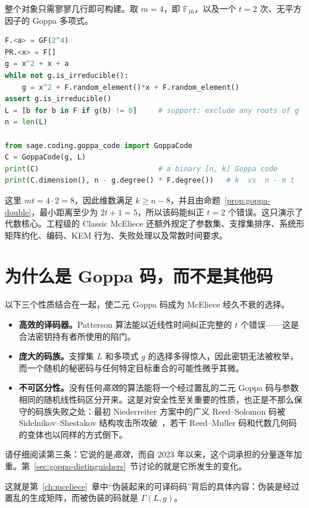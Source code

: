 整个对象只需寥寥几行即可构建。取 $m=4$，即 $\mathbb{F}_{16}$，以及一个 $t=2$ 次、无平方因子的 Goppa 多项式。

\begin{lstlisting}[language=Python]
F.<a> = GF(2^4)
PR.<x> = F[]
g = x^2 + x + a
while not g.is_irreducible():
    g = x^2 + F.random_element()*x + F.random_element()
assert g.is_irreducible()
L = [b for b in F if g(b) != 0]     # support: exclude any roots of g
n = len(L)

from sage.coding.goppa_code import GoppaCode
C = GoppaCode(g, L)
print(C)                            # a binary [n, k] Goppa code
print(C.dimension(), n - g.degree() * F.degree())   # k  vs  n - m t
\end{lstlisting}

这里 $mt = 4\cdot 2 = 8$，因此维数满足 $k\ge n-8$，并且由命题~\ref{prop:goppa-double}，最小距离至少为 $2t+1=5$，所以该码能纠正 $t=2$ 个错误。这只演示了代数核心。工程级的 Classic McEliece 还额外规定了参数集、支撑集排序、系统形矩阵约化、编码、KEM 行为、失败处理以及常数时间要求。

\section{为什么是 Goppa 码，而不是其他码}

以下三个性质结合在一起，使二元 Goppa 码成为 McEliece 经久不衰的选择。

\begin{itemize}
  \item \textbf{高效的译码器。}Patterson 算法能以近线性时间纠正完整的 $t$ 个错误——这是合法密钥持有者所使用的陷门。
  \item \textbf{庞大的码族。}支撑集 $L$ 和多项式 $g$ 的选择多得惊人，因此密钥无法被枚举，而一个随机的秘密码与任何特定目标重合的可能性微乎其微。
  \item \textbf{不可区分性。}没有任何\emph{高效}的算法能将一个经过置乱的二元 Goppa 码与参数相同的随机线性码区分开来。这是对安全性至关重要的性质，也正是不那么保守的码族失败之处：最初 Niederreiter 方案中的广义 Reed--Solomon 码被 Sidelnikov--Shestakov 结构攻击所攻破~\cite{ss1992}，若干 Reed--Muller 码和代数几何码的变体也以同样的方式倒下。
\end{itemize}

请仔细阅读第三条：它说的是\emph{高效}，而自 2023 年以来，这个词承担的分量逐年加重。第~\ref{sec:goppa-distinguishers}~节讨论的就是它所发生的变化。

这就是第~\ref{ch:mceliece}~章中“伪装起来的可译码码”背后的具体内容：伪装是经过置乱的生成矩阵，而被伪装的码就是 $\Gamma(L,g)$。

